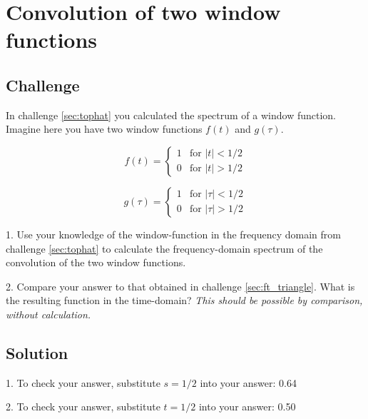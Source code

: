 \newpage
\section{Convolution of two window functions}

\subsection*{Challenge}

In challenge \ref{sec:tophat} you calculated the spectrum of a window function. Imagine here you have two window functions $f(t)$ and $g(\tau)$.

\begin{equation}
    f(t)=
    \begin{cases}
        1 & \text{for } |t| < 1/2 \\
        0 & \text{for } |t| > 1/2
    \end{cases}
\end{equation}

\begin{equation}
    g(\tau)=
    \begin{cases}
        1 & \text{for } |\tau| < 1/2 \\
        0 & \text{for } |\tau| > 1/2
    \end{cases}
\end{equation}

1. Use your knowledge of the window-function in the frequency domain from challenge \ref{sec:tophat} to calculate the frequency-domain spectrum of the convolution of the two window functions.

2. Compare your answer to that obtained in challenge \ref{sec:ft_triangle}. What is the resulting function in the time-domain? \emph{This should be possible by comparison, without calculation.}

\subsection*{Solution}
1. To check your answer, substitute $s=1/2$ into your answer: 0.64

2. To check your answer, substitute $t=1/2$ into your answer: 0.50

